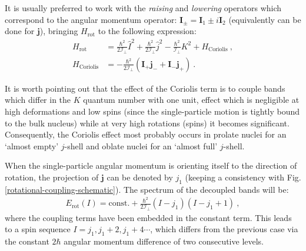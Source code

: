 It is usually preferred to work with the \emph{raising} and \emph{lowering} operators which correspond to the angular momentum operator: $\mathbf{I}_\pm=\mathbf{I}_1\pm i \mathbf{I}_2$ (equivalently can be done for $\mathbf{j}$), bringing $H_\text{rot}$ to the following expression:
\begin{align}
    H_\text{rot}&=\frac{\hbar^2}{2\mathcal{I}_\perp}\hat{I}^2+\frac{\hbar^2}{2\mathcal{I}_\perp}\hat{j}^2-\frac{\hbar^2}{\mathcal{I}_\perp}K^2+H_\text{Coriolis}\ ,\\
    H_\text{Coriolis}&=-\frac{\hbar^2}{2\mathcal{I}_\perp}(\mathbf{I}_+\mathbf{j}_-+\mathbf{I}_-\mathbf{j}_+)\ .
\end{align}

It is worth pointing out that the effect of the Coriolis term is to couple bands which differ in the $K$ quantum number with one unit, effect which is negligible at high deformations and low spins (since the single-particle motion is tightly bound to the bulk nucleus) while at very high rotations (spins) it becomes significant. Consequently, the Coriolis effect most probably occurs in prolate nuclei for an `almost empty' $j$-shell and oblate nuclei for an `almost full' $j$-shell.

When the single-particle angular momentum is orienting itself to the direction of rotation, the projection of $\mathbf{j}$ can be denoted by $j_1$ (keeping a consistency with Fig. \ref{rotational-coupling-schematic}). The spectrum of the decoupled bands will be:
\begin{align}
    E_\text{rot}(I)=\text{const.}+\frac{\hbar^2}{2\mathcal{I}_\perp}(I-j_1)(I-j_1+1)\ ,
\end{align}
where the coupling terms have been embedded in the constant term. This leads to a spin sequence $I=j_1,j_1+2,j_1+4\cdots$, which differs from the previous case via the constant $2\hbar$ angular momentum difference of two consecutive levels.

